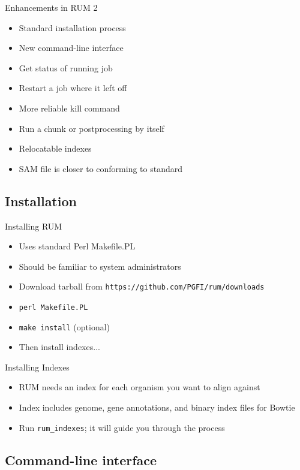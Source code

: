\documentclass{beamer}
\begin{document}
\begin{frame}{Enhancements in RUM 2}
  \begin{itemize}
  \item Standard installation process
  \item New command-line interface
  \item Get status of running job
  \item Restart a job where it left off
  \item More reliable kill command
  \item Run a chunk or postprocessing by itself
  \item Relocatable indexes
  \item SAM file is closer to conforming to standard
  \end{itemize}
\end{frame}

\subsection{Installation}

\begin{frame}{Installing RUM}
  \begin{itemize}
  \item Uses standard Perl Makefile.PL
  \item Should be familiar to system administrators
  \item Download tarball from \texttt{https://github.com/PGFI/rum/downloads}
  \item \texttt{perl Makefile.PL}
  \item \texttt{make install} (optional)
  \item Then install indexes...
  \end{itemize}
\end{frame}

\begin{frame}{Installing Indexes}
  \begin{itemize}
  \item RUM needs an index for each organism you want to align against
  \item Index includes genome, gene annotations, and binary index files for Bowtie
  \item Run \texttt{rum\_indexes}; it will guide you through the process
  \end{itemize}
\end{frame}

\subsection{Command-line interface}
\end{document}
